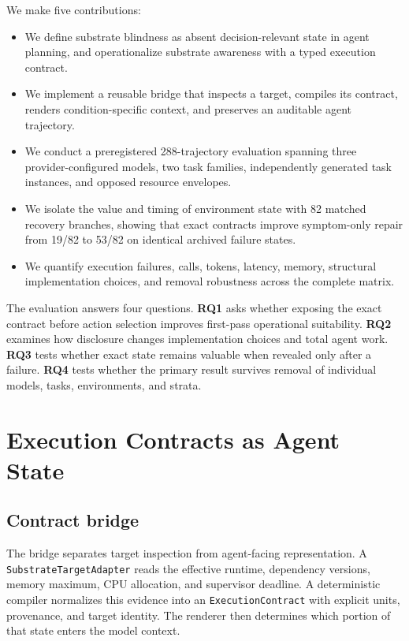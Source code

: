 \documentclass[sigconf,anonymous]{aamas}
\begin{document}
We make five contributions:
\begin{itemize}
  \item We define substrate blindness as absent decision-relevant state in agent
  planning, and operationalize substrate awareness with a typed execution contract.
  \item We implement a reusable bridge that inspects a target, compiles its
  contract, renders condition-specific context, and preserves an auditable agent
  trajectory.
  \item We conduct a preregistered 288-trajectory evaluation spanning three
  provider-configured models, two task families, independently generated task
  instances, and opposed resource envelopes.
  \item We isolate the value and timing of environment state with 82 matched
  recovery branches, showing that exact contracts improve symptom-only repair
  from 19/82 to 53/82 on identical archived failure states.
  \item We quantify execution failures, calls, tokens, latency, memory, structural
  implementation choices, and removal robustness across the complete matrix.
\end{itemize}

The evaluation answers four questions. \textbf{RQ1} asks whether exposing the
exact contract before action selection improves first-pass operational
suitability. \textbf{RQ2} examines how disclosure changes implementation choices
and total agent work. \textbf{RQ3} tests whether exact state remains valuable when
revealed only after a failure. \textbf{RQ4} tests whether the primary result
survives removal of individual models, tasks, environments, and strata.

\section{Execution Contracts as Agent State}

\subsection{Contract bridge}

The bridge separates target inspection from agent-facing representation. A
\texttt{SubstrateTargetAdapter} reads the effective runtime, dependency versions,
memory maximum, CPU allocation, and supervisor deadline. A deterministic compiler
normalizes this evidence into an \texttt{ExecutionContract} with explicit units,
provenance, and target identity. The renderer then determines which portion of
that state enters the model context.
\end{document}
